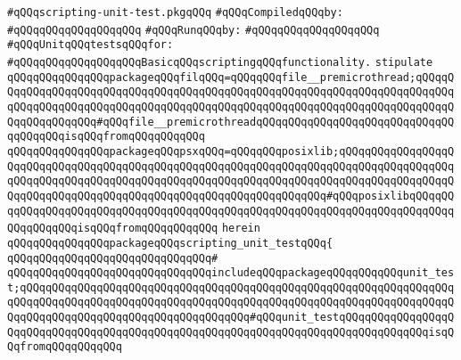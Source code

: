 \label{src/lib/src/scripting-unit-test.pkg}
\verb|#qQQqscripting-unit-test.pkgqQQq|\newline
\newline
\verb|#qQQqCompiledqQQqby:|\newline
\verb|#qQQqqQQqqQQqqQQqqQQq|\newline
\newline
\verb|#qQQqRunqQQqby:|\newline
\verb|#qQQqqQQqqQQqqQQqqQQq|\newline
\newline
\verb|#qQQqUnitqQQqtestsqQQqfor:|\newline
\verb|#qQQqqQQqqQQqqQQqqQQqBasicqQQqscriptingqQQqfunctionality.|\newline
\newline
\verb|stipulate|\newline
\verb|qQQqqQQqqQQqqQQqpackageqQQqfilqQQq=qQQqqQQqfile__premicrothread;qQQqqQQqqQQqqQQqqQQqqQQqqQQqqQQqqQQqqQQqqQQqqQQqqQQqqQQqqQQqqQQqqQQqqQQqqQQqqQQqqQQqqQQqqQQqqQQqqQQqqQQqqQQqqQQqqQQqqQQqqQQqqQQqqQQqqQQqqQQqqQQqqQQqqQQqqQQqqQQq#qQQqfile__premicrothreadqQQqqQQqqQQqqQQqqQQqqQQqqQQqqQQqqQQqqQQqisqQQqfromqQQqqQQqqQQq|\newline
\verb|qQQqqQQqqQQqqQQqpackageqQQqpsxqQQq=qQQqqQQqposixlib;qQQqqQQqqQQqqQQqqQQqqQQqqQQqqQQqqQQqqQQqqQQqqQQqqQQqqQQqqQQqqQQqqQQqqQQqqQQqqQQqqQQqqQQqqQQqqQQqqQQqqQQqqQQqqQQqqQQqqQQqqQQqqQQqqQQqqQQqqQQqqQQqqQQqqQQqqQQqqQQqqQQqqQQqqQQqqQQqqQQqqQQqqQQqqQQqqQQqqQQqqQQqqQQq#qQQqposixlibqQQqqQQqqQQqqQQqqQQqqQQqqQQqqQQqqQQqqQQqqQQqqQQqqQQqqQQqqQQqqQQqqQQqqQQqqQQqqQQqqQQqqQQqisqQQqfromqQQqqQQqqQQq|\newline
\verb|herein|\newline
\verb|qQQqqQQqqQQqqQQqpackageqQQqscripting_unit_testqQQq{|\newline
\verb|qQQqqQQqqQQqqQQqqQQqqQQqqQQqqQQq#|\newline
\verb|qQQqqQQqqQQqqQQqqQQqqQQqqQQqqQQqincludeqQQqpackageqQQqqQQqqQQqunit_test;qQQqqQQqqQQqqQQqqQQqqQQqqQQqqQQqqQQqqQQqqQQqqQQqqQQqqQQqqQQqqQQqqQQqqQQqqQQqqQQqqQQqqQQqqQQqqQQqqQQqqQQqqQQqqQQqqQQqqQQqqQQqqQQqqQQqqQQqqQQqqQQqqQQqqQQqqQQqqQQqqQQqqQQqqQQqqQQq#qQQqunit_testqQQqqQQqqQQqqQQqqQQqqQQqqQQqqQQqqQQqqQQqqQQqqQQqqQQqqQQqqQQqqQQqqQQqqQQqqQQqqQQqqQQqisqQQqfromqQQqqQQqqQQq|\newline
